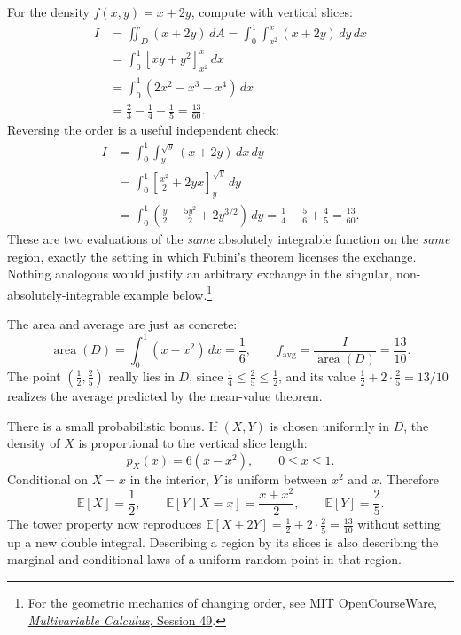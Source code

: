 For the density $f(x,y)=x+2y$, compute with vertical slices:
\[
 \begin{aligned}
 I&=\iint_D(x+2y)\,dA
  =\int_0^1\!\int_{x^2}^{x}(x+2y)\,dy\,dx\\
  &=\int_0^1\left[x y+y^2\right]_{x^2}^{x}\,dx\\
  &=\int_0^1(2x^2-x^3-x^4)\,dx\\
  &=\frac23-\frac14-\frac15=\boxed{\frac{13}{60}}.
 \end{aligned}
\]
Reversing the order is a useful independent check:
\[
 \begin{aligned}
 I&=\int_0^1\!\int_y^{\sqrt y}(x+2y)\,dx\,dy\\
  &=\int_0^1\left[
        \frac{x^2}{2}+2yx\right]_{y}^{\sqrt y}\,dy\\
  &=\int_0^1\left(\frac y2-\frac{5y^2}{2}
                  +2y^{3/2}\right)\,dy
   =\frac14-\frac56+\frac45=\frac{13}{60}.
 \end{aligned}
\]
These are two evaluations of the \emph{same} absolutely integrable function on the \emph{same} region, exactly the setting in which Fubini's theorem licenses the exchange. Nothing analogous would justify an arbitrary exchange in the singular, non-absolutely-integrable example below.\footnote{For the geometric mechanics of changing order, see MIT OpenCourseWare, \href{https://ocw.mit.edu/courses/18-02sc-multivariable-calculus-fall-2010/pages/3.-double-integrals-and-line-integrals-in-the-plane/part-a-double-integrals/session-49-exchanging-the-order-of-integration/}{\emph{Multivariable Calculus}, Session 49}.}

The area and average are just as concrete:
\[
 \operatorname{area}(D)=\int_0^1(x-x^2)\,dx=\frac16,
 \qquad
 f_{\mathrm{avg}}=\frac{I}{\operatorname{area}(D)}
                 =\boxed{\frac{13}{10}}.
\]
The point $(\tfrac12,\tfrac25)$ really lies in $D$, since
$\tfrac14\le\tfrac25\le\tfrac12$, and its value
$\tfrac12+2\cdot\tfrac25=13/10$ realizes the average predicted by the mean-value theorem.

There is a small probabilistic bonus. If $(X,Y)$ is chosen uniformly in $D$, the density of $X$ is proportional to the vertical slice length:
\[
 p_X(x)=6(x-x^2),\qquad0\le x\le1.
\]
Conditional on $X=x$ in the interior, $Y$ is uniform between $x^2$ and $x$. Therefore
\[
 \mathbb E[X]=\frac12,\qquad
 \mathbb E[Y\mid X=x]=\frac{x+x^2}{2},
 \qquad \mathbb E[Y]=\frac25.
\]
The tower property now reproduces
$\mathbb E[X+2Y]=\frac12+2\cdot\frac25=\frac{13}{10}$
without setting up a new double integral. Describing a region by its slices is also describing the marginal and conditional laws of a uniform random point in that region.

